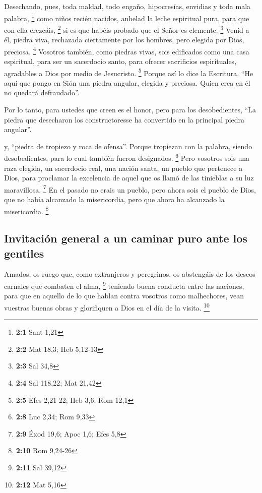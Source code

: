 \begin{paracol}{2}
 Desechando, pues, toda maldad, todo engaño, hipocresías,
envidias y toda mala palabra, \footnote{\textbf{2:1} Sant 1,21}
 como niños recién nacidos, anhelad la leche espiritual
pura, para que con ella crezcáis, \footnote{\textbf{2:2} Mat 18,3; Heb
  5,12-13}  si es que habéis probado que el Señor es
clemente. \footnote{\textbf{2:3} Sal 34,8}  Venid a él,
piedra viva, rechazada ciertamente por los hombres, pero elegida por
Dios, preciosa. \footnote{\textbf{2:4} Sal 118,22; Mat 21,42}
 Vosotros también, como piedras vivas, sois edificados
como una casa espiritual, para ser un sacerdocio santo, para ofrecer
sacrificios espirituales, agradables a Dios por medio de Jesucristo.
\footnote{\textbf{2:5} Efes 2,21-22; Heb 3,6; Rom 12,1} 
Porque así lo dice la Escritura, ``He aquí que pongo en Sión una piedra
angular, elegida y preciosa. Quien crea en él no quedará defraudado''.

 Por lo tanto, para ustedes que creen es el honor, pero
para los desobedientes, ``La piedra que desecharon los constructoresse
ha convertido en la principal piedra angular''.

 y, ``piedra de tropiezo y roca de ofensa''. Porque
tropiezan con la palabra, siendo desobedientes, para lo cual también
fueron designados. \footnote{\textbf{2:8} Luc 2,34; Rom 9,33}
 Pero vosotros sois una raza elegida, un sacerdocio real,
una nación santa, un pueblo que pertenece a Dios, para proclamar la
excelencia de aquel que os llamó de las tinieblas a su luz maravillosa.
\footnote{\textbf{2:9} Éxod 19,6; Apoc 1,6; Efes 5,8}  En
el pasado no erais un pueblo, pero ahora sois el pueblo de Dios, que no
había alcanzado la misericordia, pero que ahora ha alcanzado la
misericordia. \footnote{\textbf{2:10} Rom 9,24-26}

\hypertarget{invitaciuxf3n-general-a-un-caminar-puro-ante-los-gentiles}{%
\subsection{Invitación general a un caminar puro ante los
gentiles}\label{invitaciuxf3n-general-a-un-caminar-puro-ante-los-gentiles}}

 Amados, os ruego que, como extranjeros y peregrinos, os
abstengáis de los deseos carnales que combaten el alma, \footnote{\textbf{2:11}
  Sal 39,12}  teniendo buena conducta entre las naciones,
para que en aquello de lo que hablan contra vosotros como malhechores,
vean vuestras buenas obras y glorifiquen a Dios en el día de la visita.
\footnote{\textbf{2:12} Mat 5,16}


\end{paracol}
